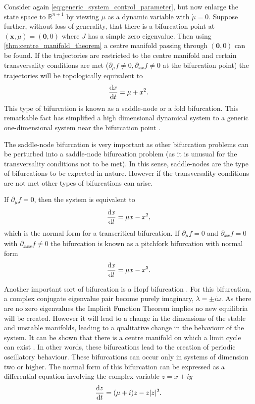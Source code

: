 Consider again \cref{eq:generic_system_control_parameter}, but now enlarge the state space to $\mathbb{R}^{n+1}$ by viewing $\mu$ as a dynamic variable with $\dot{\mu} = 0$. Suppose
further, without loss of generality, that there is a bifurcation point at $(\bm{x},\mu)  = (\bm{0},0)$ where $J$ has a simple zero eigenvalue.
Then using \cref{thm:centre_manifold_theorem} a centre manifold passing through
$(\bm{0},0)$ can be found. If the trajectories are restricted to the centre manifold and certain transversality conditions are met ($\partial_{\mu}f \neq 0,\partial_{xx} f\neq 0$ at the
bifurcation point) the trajectories will be topologically equivalent \parencite{guckenheimer2013} to
\begin{equation}
  \label{eq:saddle_node}
  \dv{x}{t}  = \mu + x^2.
\end{equation}
This type of bifurcation is known as a saddle-node or a fold bifurcation.
This remarkable fact has simplified a high dimensional dynamical system to a generic one-dimensional system near the bifurcation point \parencite{Glendinning1994}.

The saddle-node bifurcation is very important as other bifurcation problems can be perturbed into a saddle-node bifurcation problem (as it is unusual for the transversality conditions
not to be met). In this sense, saddle-nodes are the type of bifurcations to be expected in nature. However if the transversality conditions are not met other types of bifurcations can arise.

If $\partial_{\mu}f=0$, then the system is equivalent to
\begin{equation}
  \label{eq:transcritical}
  \dv{x}{t} = \mu x - x^2,
\end{equation}
which is the normal form for a transcritical bifurcation. If $\partial_{\mu}f = 0$ and $\partial_{xx}f=0$ with $\partial_{xxx}f \neq 0$
the bifurcation is known as a pitchfork bifurcation with normal form
\begin{equation}
  \label{eq:pitchfork}
  \dv{x}{t} = \mu x - x^3.
\end{equation}

Another important sort of bifurcation is a Hopf bifurcation \parencite{Hopf1942}. For this bifurcation, a complex conjugate eigenvalue pair become purely imaginary, $\lambda = \pm i\omega$.
As there are no zero eigenvalues the Implicit Function Theorem implies no new equilibria will be created. However it will lead to a change in the dimensions of the
stable and unstable manifolds, leading to a qualitative change in the behaviour of the system. It can be shown that there is a centre manifold on which a limit cycle can exist
\parencite{guckenheimer2013}. In other words, these bifurcations lead to the creation of periodic oscillatory behaviour. These bifurcations
can occur only in systems of dimension two or higher. The normal form of this bifurcation \parencite{Kuznetsov2004} can be expressed as a differential equation involving the complex variable $z = x + iy$
\begin{equation}
  \label{eq:hopf}
  \dv{z}{t} = (\mu + i) z - z|z|^2.
\end{equation}

